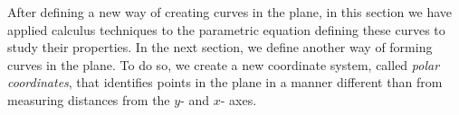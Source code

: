 After defining a new way of creating curves in the plane, in this section we have applied calculus techniques to the parametric equation defining these curves to study their properties. In the next section, we define another way of forming curves in the plane. To do so, we create a new coordinate system, called \emph{polar coordinates}, that identifies points in the plane in a manner different than from measuring distances from the $y$- and $x$- axes.

